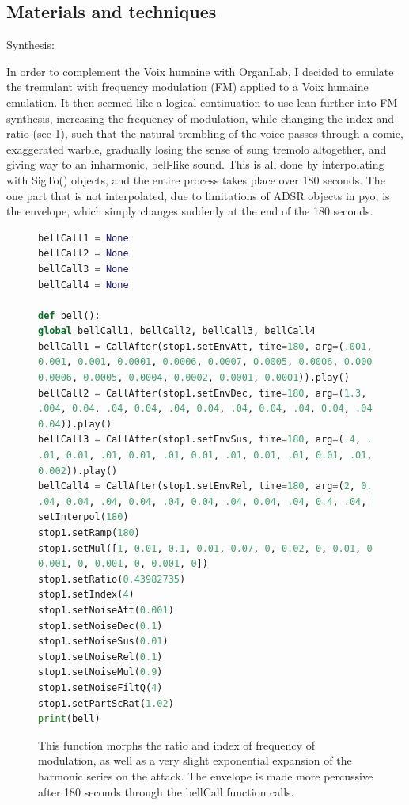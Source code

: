 \documentclass[12pt,twoside,maitrise]{dms_ks}
\theoremstyle{definition}
\begin{document}
{{\subsection{Materials and techniques}

Synthesis:

In order to complement the Voix humaine with OrganLab, I decided to emulate the tremulant with frequency modulation (FM) applied to a Voix humaine emulation.  
It then seemed like a logical continuation to use lean further into FM synthesis, increasing the frequency of modulation, while changing the index and ratio (see \cref{fig:fm}), such that the natural trembling of the voice passes through a comic, exaggerated warble, gradually losing the sense of sung tremolo altogether, and giving way to an inharmonic, bell-like sound.  
This is all done by interpolating with SigTo() objects, and the entire process takes place over 180 seconds.  
The one part that is not interpolated, due to limitations of ADSR objects in pyo, is the envelope, which simply changes suddenly at the end of the 180 seconds.

\begin{figure}[H]  
\begin{lstlisting}[language=Python]  
bellCall1 = None  
bellCall2 = None  
bellCall3 = None  
bellCall4 = None

def bell():  
global bellCall1, bellCall2, bellCall3, bellCall4  
bellCall1 = CallAfter(stop1.setEnvAtt, time=180, arg=(.001, .001, .001, .001, 
0.001, 0.001, 0.0001, 0.0006, 0.0007, 0.0005, 0.0006, 0.0003, 0.0005, 0.0003, 
0.0006, 0.0005, 0.0004, 0.0002, 0.0001, 0.0001)).play()  
bellCall2 = CallAfter(stop1.setEnvDec, time=180, arg=(1.3, .05, .02, 0, 0, 0.04, 
.004, 0.04, .04, 0.04, .04, 0.04, .04, 0.04, .04, 0.04, .04, 0.04, .04, 
0.04)).play()  
bellCall3 = CallAfter(stop1.setEnvSus, time=180, arg=(.4, .1, .02, .01, .01, 0.01, 
.01, 0.01, .01, 0.01, .01, 0.01, .01, 0.01, .01, 0.01, .01, 0.01, .002, 
0.002)).play()  
bellCall4 = CallAfter(stop1.setEnvRel, time=180, arg=(2, 0.1, 0.1, .01, .03, 0.4, 
.04, 0.04, .04, 0.04, .04, 0.04, .04, 0.04, .04, 0.4, .04, 0.04, .04, 0.4)).play()  
setInterpol(180)  
stop1.setRamp(180)  
stop1.setMul([1, 0.01, 0.1, 0.01, 0.07, 0, 0.02, 0, 0.01, 0, 0.003, 0, 0.003, 0, 
0.001, 0, 0.001, 0, 0.001, 0])  
stop1.setRatio(0.43982735)  
stop1.setIndex(4)  
stop1.setNoiseAtt(0.001)  
stop1.setNoiseDec(0.1)  
stop1.setNoiseSus(0.01)  
stop1.setNoiseRel(0.1)  
stop1.setNoiseMul(0.9)  
stop1.setNoiseFiltQ(4)  
stop1.setPartScRat(1.02)  
print(bell)  
\end{lstlisting}  
\caption{This function morphs the ratio and index of frequency of modulation, as well as a very slight exponential expansion of the harmonic series on the attack. The envelope is made more percussive after 180 seconds through the bellCall function calls.}  
\label{fig:fm}
\end{figure}

}}
\end{document}
